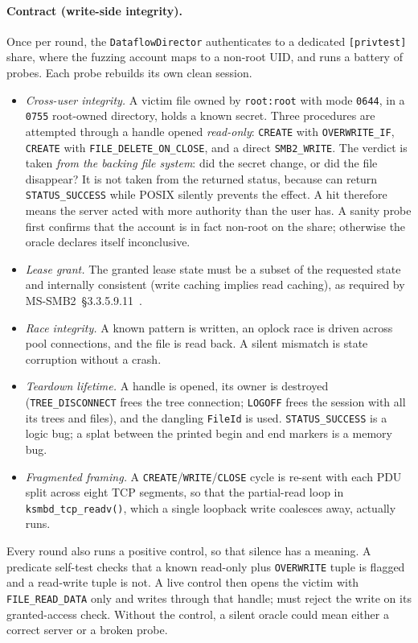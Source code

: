 \documentclass{article}
\begin{document}
\paragraph{Contract (write-side integrity).} Once per round, the
\texttt{DataflowDirector} authenticates to a dedicated \texttt{[privtest]}
share, where the fuzzing account maps to a non-root UID, and runs a battery of
probes. Each probe rebuilds its own clean session.
\begin{itemize}[nosep]
  \item \emph{Cross-user integrity.} A victim file owned by \texttt{root:root}
        with mode \texttt{0644}, in a \texttt{0755} root-owned directory,
        holds a known secret. Three procedures are attempted through a
        handle opened \emph{read-only}: \texttt{CREATE} with
        \texttt{OVERWRITE\_IF}, \texttt{CREATE} with
        \texttt{FILE\_DELETE\_ON\_CLOSE}, and a direct \texttt{SMB2\_WRITE}.
        The verdict is taken \emph{from the backing file system}: did the
        secret change, or did the file disappear? It is not taken from the
        returned status, because \ksmbd can return \texttt{STATUS\_SUCCESS}
        while POSIX silently prevents the effect. A hit therefore means the
        server acted with more authority than the user has. A sanity probe
        first confirms that the account is in fact non-root on the share;
        otherwise the oracle declares itself inconclusive.
  \item \emph{Lease grant.} The granted lease state must be a subset of the
        requested state and internally consistent (write caching implies
        read caching), as required by MS-SMB2~\S3.3.5.9.11~\cite{mssmb2}.
  \item \emph{Race integrity.} A known pattern is written, an oplock race is
        driven across pool connections, and the file is read back. A silent
        mismatch is state corruption without a crash.
  \item \emph{Teardown lifetime.} A handle is opened, its owner is destroyed
        (\texttt{TREE\_DISCONNECT} frees the tree connection; \texttt{LOGOFF}
        frees the session with all its trees and files), and the dangling
        \texttt{FileId} is used. \texttt{STATUS\_SUCCESS} is a logic bug; a
        \kasan splat between the printed begin and end markers is a memory
        bug.
  \item \emph{Fragmented framing.} A \texttt{CREATE}/\texttt{WRITE}/\texttt{CLOSE}
        cycle is re-sent with each PDU split across eight TCP segments, so
        that the partial-read loop in \texttt{ksmbd\_tcp\_readv()}, which a
        single loopback write coalesces away, actually runs.
\end{itemize}
Every round also runs a positive control, so that silence has a meaning. A
predicate self-test checks that a known read-only plus \texttt{OVERWRITE}
tuple is flagged and a read-write tuple is not. A live control then opens the
victim with \texttt{FILE\_READ\_DATA} only and writes through that handle;
\ksmbd must reject the write on its granted-access check. Without the
control, a silent oracle could mean either a correct server or a broken
probe.
\end{document}
